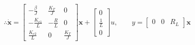 $$
    \therefore \dot{\pmb{x}} = 
    \begin{bmatrix} 
        -\frac{\beta}{J} & \frac{K_T}{J} & 0\\[5pt]
        -\frac{K_{e1}}{L} & -\frac{R}{L} & 0\\[5pt]
        \frac{K_{e2}}{L} & 0 & \frac{K_T}{J}
    \end{bmatrix}
    \pmb{x} +
    \begin{bmatrix} 
        0\\[5pt]
        \frac{1}{L}\\[5pt]
        0
    \end{bmatrix}
    u,\qquad y = 
    \begin{bmatrix}
        0 & 0 & R_L
    \end{bmatrix}
    \pmb{x}
$$

